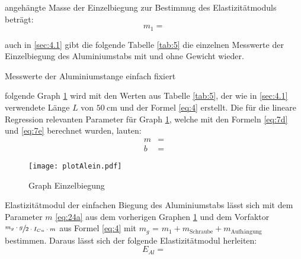 \justifying angehängte Masse der Einzelbiegung zur Bestimmug des Elastizitätmoduls beträgt:
\begin{equation}
    m_1 = \text{} \label{eq:23}
\end{equation}

\justifying auch in \ref{sec:4.1} gibt die folgende Tabelle \ref{tab:5} die einzelnen Messwerte der Einzelbiegung des Aluminiumstabs mit und ohne Gewicht
wieder.
\begin{table}[H]
    \centering
    
    \caption{Messwerte der Aluminiumstange einfach fixiert}
    \label{tab:5}
\end{table}

\justifying  folgende Graph \ref{fig:3} wird mit den Werten aus Tabelle \ref{tab:5}, der wie in \ref{sec:4.1} verwendete Länge $L$ von
$\SI{50}{\centi\meter}$ und der Formel \eqref{eq:4} erstellt. Die für die lineare Regression relevanten Parameter für Graph \ref{fig:3}, welche mit 
den Formeln \eqref{eq:7d} und \eqref{eq:7e} berechnet wurden,
lauten:
\begin{subequations}\label{eq:24}
\begin{align}
    m &= \text{} \label{eq:24a}\\
    b &= \text{} \label{eq:24b}
\end{align}
\end{subequations}

\begin{figure}[H]
    \centering
    \texttt{[image: plotAlein.pdf]}
    \caption{Graph Einzelbiegung}
    \label{fig:3}
\end{figure}

\justifying Elastizitätmodul der einfachen Biegung des Aluminiumstabs lässt sich mit dem Parameter $m$ \eqref{eq:24a} aus dem
vorherigen Graphen \ref{fig:3} und dem Vorfaktor $\sfrac{m_g \cdot g}{2 \cdot I_{Cu} \cdot m}$ aus Formel \eqref{eq:4} mit $m_g$ = $m_1 + 
m_{\text{Schraube}} + m_{\text{Aufhängung}}$ bestimmen. Daraus lässt sich der folgende Elastizitätmodul herleiten:
\begin{equation}
E_{Al} =  \label{eq:25}
\end{equation}


